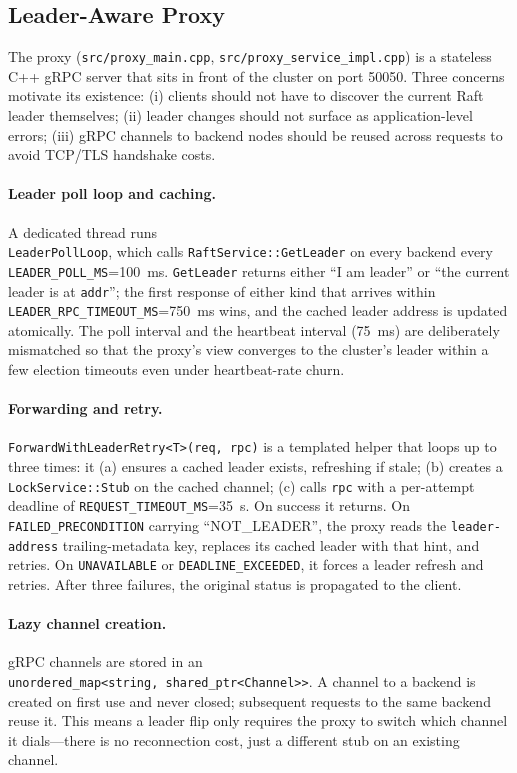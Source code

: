 \documentclass[sigconf]{acmart}
\begin{document}
\subsection{Leader-Aware Proxy}
\label{sec:proxy}

The proxy (\texttt{src/proxy\_main.cpp},
\texttt{src/proxy\_service\_impl.cpp}) is a stateless C++ gRPC server that
sits in front of the cluster on port 50050. Three concerns motivate its
existence: (i) clients should not have to discover the current Raft leader
themselves; (ii) leader changes should not surface as application-level
errors; (iii) gRPC channels to backend nodes should be reused across requests
to avoid TCP/TLS handshake costs.

\paragraph{\textbf{Leader poll loop and caching.}}
A dedicated thread runs \\ \texttt{LeaderPollLoop}, which calls
\texttt{RaftService::GetLeader} on every backend every
\texttt{LEADER\_POLL\_MS}=100~ms. \texttt{GetLeader} returns either
``I am leader'' or ``the current leader is at \texttt{addr}''; the first
response of either kind that arrives within
\texttt{LEADER\_RPC\_TIMEOUT\_MS}=750~ms wins, and the cached leader address
is updated atomically. The poll interval and the heartbeat interval
(75~ms) are deliberately mismatched so that the proxy's view converges to
the cluster's leader within a few election timeouts even under
heartbeat-rate churn.

\paragraph{\textbf{Forwarding and retry.}}
\texttt{ForwardWithLeaderRetry<T>(req, rpc)} is a templated helper that
loops up to three times: it (a) ensures a cached leader exists, refreshing
if stale; (b) creates a \texttt{LockService::Stub} on the cached channel;
(c) calls \texttt{rpc} with a per-attempt deadline of
\texttt{REQUEST\_TIMEOUT\_MS}=35~s. On success it returns. On
\texttt{FAILED\_PRECONDITION} carrying ``NOT\_LEADER'', the proxy reads
the \texttt{leader-address} trailing-metadata key, replaces its cached
leader with that hint, and retries. On \texttt{UNAVAILABLE} or
\texttt{DEADLINE\_EXCEEDED}, it forces a leader refresh and retries.
After three failures, the original status is propagated to the client.

\paragraph{\textbf{Lazy channel creation.}}
gRPC channels are stored in an \\ \texttt{unordered\_map<string,
shared\_ptr<Channel>>}. A channel to a backend is created on first use
and never closed; subsequent requests to the same backend reuse it.
This means a leader flip only requires the proxy to switch which channel
it dials---there is no reconnection cost, just a different stub on an
existing channel.
\end{document}
